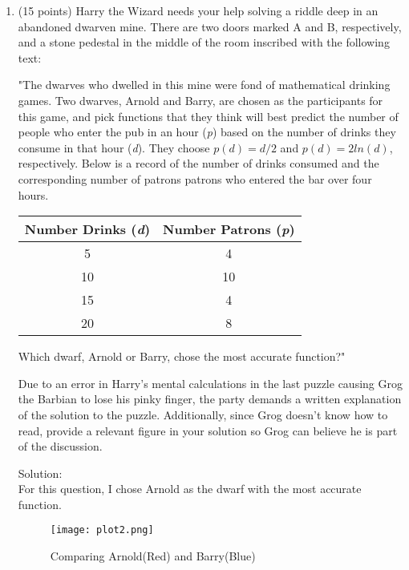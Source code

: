 \documentclass[12pt]{article}
\begin{document}
\begin{enumerate}
	\newpage

	\item (15 points) Harry the Wizard needs your help solving a riddle deep in an abandoned dwarven mine. There are two doors marked A and B, respectively, and a stone pedestal in the middle of the room inscribed with the following text:

    \scriptsize

    "The dwarves who dwelled in  this mine were fond of mathematical drinking games. Two dwarves, Arnold and Barry, are chosen as the participants for this game, and pick functions that they think will best predict the number of people who enter the pub in an hour (\textit{p}) based on the number of drinks they consume in that hour (\textit{d}). They choose $p(d) = d/2$ and $p(d)= 2ln(d)$, respectively. Below is a record of the number of drinks consumed and the corresponding number of patrons patrons who entered the bar over four hours.

    \begin{center}
        \begin{tabular}{|c | c |}
        \hline
        Number Drinks (\textit{d}) & Number Patrons (\textit{p})\\ \hline
        5 & 4  \\ \hline
        10 & 10  \\ \hline
        15 & 4  \\ \hline
        20 & 8  \\ \hline

        \end{tabular}
    \end{center}

    Which dwarf, Arnold or Barry, chose the most accurate function?"

    \normalsize
    Due to an error in Harry's mental calculations in the last puzzle causing Grog the Barbian to lose his pinky finger, the party demands  a written explanation of the solution to the puzzle. Additionally, since Grog doesn't know how to read, provide a relevant figure in your solution so Grog can believe he is part of the discussion.

	Solution:\\
	For this question, I chose Arnold as the dwarf with the most accurate function.\\
	\begin{figure}[!h]
		\centering
		\texttt{[image: plot2.png]}
		\caption{Comparing Arnold(Red) and Barry(Blue)}
	\end{figure} 
	

\end{enumerate}
\end{document}

